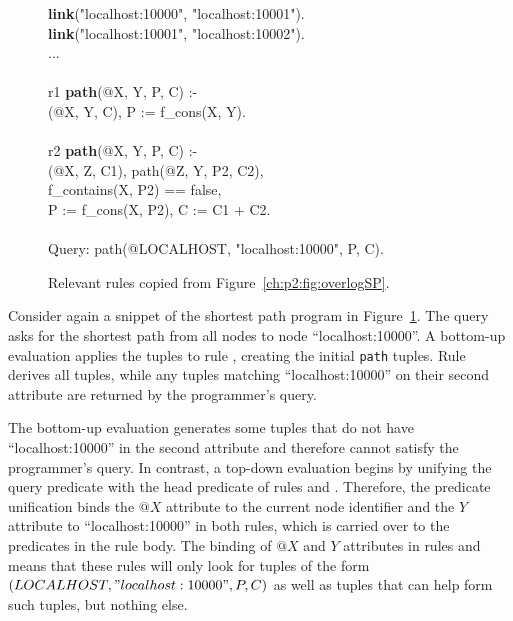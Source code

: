 \begin{figure}[!t]
\ssp
\centering
\begin{boxedminipage}{\linewidth}
{\bf link}("localhost:10000", "localhost:10001").\\
{\bf link}("localhost:10001", "localhost:10002").\\
...\\
\\
r1 {\bf path}(@X, Y, P, C) :- \\
(@X, Y, C), P := f\_cons(X, Y). \\
\\
r2 {\bf path}(@X, Y, P, C) :- \\
(@X, Z, C1), path(@Z, Y, P2, C2),\\
\datalogspace f\_contains(X, P2) == false, \\
\datalogspace P := f\_cons(X, P2), C := C1 + C2. \\
\\
Query: path(@LOCALHOST, "localhost:10000", P, C).
\end{boxedminipage}
\caption{\label{ch:evita:fig:querySP}Relevant rules copied from Figure~\ref{ch:p2:fig:overlogSP}.}
\end{figure}

Consider again a snippet of the shortest path program in Figure~\ref{ch:evita:fig:querySP}. 
The query asks for the shortest path from all nodes to node ``localhost:10000''. A bottom-up evaluation
applies the  tuples to rule , creating the initial {\tt path} tuples. Rule  derives all  tuples,
while any  tuples matching ``localhost:10000'' on their second attribute are returned by the programmer's 
query.  

The bottom-up evaluation generates some  tuples that do not have ``localhost:10000'' in 
the second attribute and therefore cannot satisfy the programmer's query.  In contrast, a top-down
evaluation begins by unifying the query predicate with the head predicate of rules  and
. Therefore, the  predicate unification binds the $@X$ attribute to the current node
identifier and the $Y$ attribute to ``localhost:10000'' in both rules, which is carried over to the predicates 
in the rule body. The binding of $@X$ and $Y$ attributes in rules  and  means that these
rules will only look for tuples of the form $(LOCALHOST,"localhost:10000",P,C)$ as well as 
tuples that can help form such  tuples, but nothing else.

